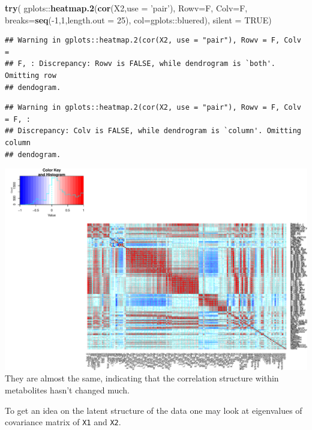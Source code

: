 \documentclass[]{article}
\newenvironment{Shaded}{\begin{snugshade}}{\end{snugshade}}
\newcommand{\KeywordTok}[1]{\textcolor[rgb]{0.13,0.29,0.53}{\textbf{{#1}}}}
\newcommand{\DataTypeTok}[1]{\textcolor[rgb]{0.13,0.29,0.53}{{#1}}}
\newcommand{\DecValTok}[1]{\textcolor[rgb]{0.00,0.00,0.81}{{#1}}}
\newcommand{\StringTok}[1]{\textcolor[rgb]{0.31,0.60,0.02}{{#1}}}
\newcommand{\OtherTok}[1]{\textcolor[rgb]{0.56,0.35,0.01}{{#1}}}
\newcommand{\NormalTok}[1]{{#1}}
\begin{document}
\begin{Shaded}
\begin{Highlighting}[]
\KeywordTok{try}\NormalTok{(}
  \NormalTok{gplots::}\KeywordTok{heatmap.2}\NormalTok{(}\KeywordTok{cor}\NormalTok{(X2,}\DataTypeTok{use =} \StringTok{'pair'}\NormalTok{), }\DataTypeTok{Rowv=}\NormalTok{F, }\DataTypeTok{Colv=}\NormalTok{F, }
                    \DataTypeTok{breaks=}\KeywordTok{seq}\NormalTok{(-}\DecValTok{1}\NormalTok{,}\DecValTok{1}\NormalTok{,}\DataTypeTok{length.out =} \DecValTok{25}\NormalTok{), }\DataTypeTok{col=}\NormalTok{gplots::bluered),}
  \DataTypeTok{silent =} \OtherTok{TRUE}\NormalTok{)}
\end{Highlighting}
\end{Shaded}

\begin{verbatim}
## Warning in gplots::heatmap.2(cor(X2, use = "pair"), Rowv = F, Colv =
## F, : Discrepancy: Rowv is FALSE, while dendrogram is `both'. Omitting row
## dendogram.
\end{verbatim}

\begin{verbatim}
## Warning in gplots::heatmap.2(cor(X2, use = "pair"), Rowv = F, Colv = F, :
## Discrepancy: Colv is FALSE, while dendrogram is `column'. Omitting column
## dendogram.
\end{verbatim}

\includegraphics{Figs/Heatmap of correlations-2.pdf} They are almost the
same, indicating that the correlation structure within metabolites
hasn't changed much.

To get an idea on the latent structure of the data one may look at
eigenvalues of covariance matrix of \texttt{X1} and \texttt{X2}.
\end{document}
